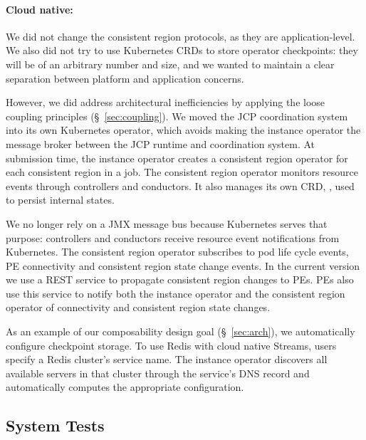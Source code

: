 \paragraph{Cloud native:} We did not change the consistent region protocols, as
they are application-level. We also did not try to use Kubernetes CRDs to store
operator checkpoints: they will be of an arbitrary number and size, and we
wanted to maintain a clear separation between platform and application concerns.

However, we did address architectural inefficiencies by applying the loose
coupling principles (\S~\ref{sec:coupling}).  We moved the JCP coordination
system into its own Kubernetes operator, which avoids making the instance
operator the message broker between the JCP runtime and coordination system. At
submission time, the instance operator creates a consistent region operator for
each consistent region in a job. The consistent region operator monitors
resource events through controllers and conductors. It also manages its own CRD,
, used to persist internal states.

We no longer rely on a JMX message bus because Kubernetes serves that purpose:
controllers and conductors receive resource event notifications from Kubernetes.
The consistent region operator subscribes to pod life cycle events, PE
connectivity and consistent region state change events.  In the current version
we use a REST service to propagate consistent region changes to PEs. PEs also
use this service to notify both the instance operator and the consistent region
operator of connectivity and consistent region state changes.

As an example of our composability design goal (\S~\ref{sec:arch}), we
automatically configure checkpoint storage. To use Redis with cloud native
Streams, users specify a Redis cluster's service name.  The instance operator
discovers all available servers in that cluster through the service's DNS record
and automatically computes the appropriate configuration.

\subsection{System Tests}

